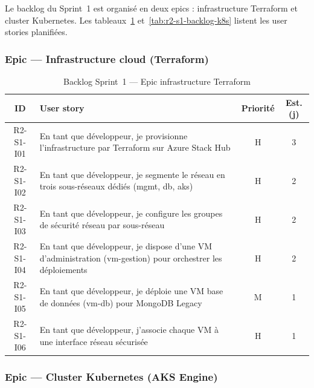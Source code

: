 Le backlog du Sprint~1 est organisé en deux epics : infrastructure Terraform et cluster
Kubernetes. Les tableaux~\ref{tab:r2-s1-backlog-infra} et~\ref{tab:r2-s1-backlog-k8s} listent
les user stories planifiées.

\subsubsection{Epic — Infrastructure cloud (Terraform)}

\begin{table}[H]
\centering
\caption{Backlog Sprint~1 — Epic infrastructure Terraform}
\label{tab:r2-s1-backlog-infra}
\footnotesize
\renewcommand{\arraystretch}{0.9}
\setlength{\tabcolsep}{4pt}
\begin{tabular}{|c|p{7.8cm}|c|c|}
\hline
\textbf{ID} & \textbf{User story} & \textbf{Priorité} & \textbf{Est. (j)} \\
\hline
R2-S1-I01 &
  En tant que développeur, je provisionne l'infrastructure par Terraform sur Azure Stack Hub &
  H & 3 \\
\hline
R2-S1-I02 &
  En tant que développeur, je segmente le réseau en trois sous-réseaux dédiés (mgmt, db, aks) &
  H & 2 \\
\hline
R2-S1-I03 &
  En tant que développeur, je configure les groupes de sécurité réseau par sous-réseau &
  H & 2 \\
\hline
R2-S1-I04 &
  En tant que développeur, je dispose d'une VM d'administration (vm-gestion) pour orchestrer les déploiements &
  H & 2 \\
\hline
R2-S1-I05 &
  En tant que développeur, je déploie une VM base de données (vm-db) pour MongoDB Legacy &
  M & 1 \\
\hline
R2-S1-I06 &
  En tant que développeur, j'associe chaque VM à une interface réseau sécurisée &
  H & 1 \\
\hline
\end{tabular}
\end{table}

\subsubsection{Epic — Cluster Kubernetes (AKS Engine)}

